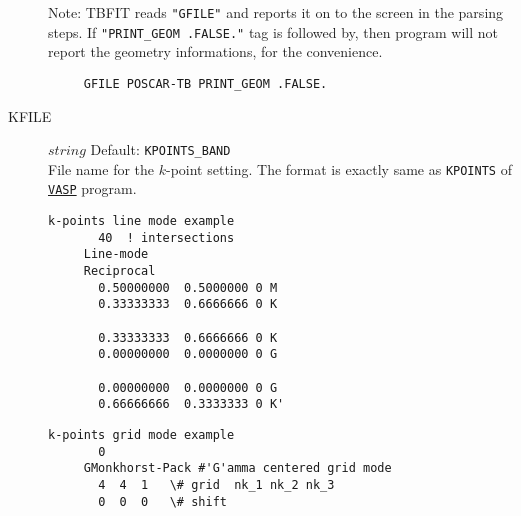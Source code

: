 \documentclass[a4paper,12pt]{scrartcl}
\makeatletter
\def\namedlabel#1#2{\begingroup
    #2%
    \def\@currentlabel{#2}%
    \phantomsection\label{#1}\endgroup
}
\makeatother
\begin{document}
\begin{description}
\begin{Verbatim}[commandchars=\\\{\},gobble=4, frame=single, framesep=2mm, 
            label= POSCAR-TB example: MoS$_2$ with \texttt{Mo}-$d$ and \texttt{S}-$s$$p$,
            labelposition=bottomline]
        \end{Verbatim}
        
        Note: TBFIT reads \texttt{"GFILE"} and reports it on to the screen in the parsing steps.
        If \texttt{"PRINT\_GEOM .FALSE."} tag is followed by, then program will not report the 
        geometry informations, for the convenience.
     \begin{verbatim}
     GFILE POSCAR-TB PRINT_GEOM .FALSE.
     \end{verbatim}


    \item[\namedlabel{tag:KFILE}{KFILE}] $string$ Default: \texttt{KPOINTS\_BAND}  \\
        File name for the $k$-point setting.
        The format is exactly same as \texttt{KPOINTS} of \href{https://www.vasp.at}{\texttt{VASP}}
        program.

        \begin{Verbatim}[commandchars=\\\{\},gobble=4, frame=single, framesep=2mm, 
            label= KPOINTS\_BAND $line$ $mode$ example, 
            labelposition=bottomline]
     k-points line mode example
       40  ! intersections
     Line-mode
     Reciprocal
       0.50000000  0.5000000 0 M
       0.33333333  0.6666666 0 K
       
       0.33333333  0.6666666 0 K
       0.00000000  0.0000000 0 G
       
       0.00000000  0.0000000 0 G
       0.66666666  0.3333333 0 K'

        \end{Verbatim}

        \begin{Verbatim}[commandchars=\\\{\},gobble=4, frame=single, framesep=2mm, 
            label= KPOINTS\_BAND $grid$ $mode$ example, 
            labelposition=bottomline]
     k-points grid mode example
       0 
     GMonkhorst-Pack #'G'amma centered grid mode
       4  4  1   \# grid  nk_1 nk_2 nk_3
       0  0  0   \# shift
        \end{Verbatim}


\end{description}
\end{document}
